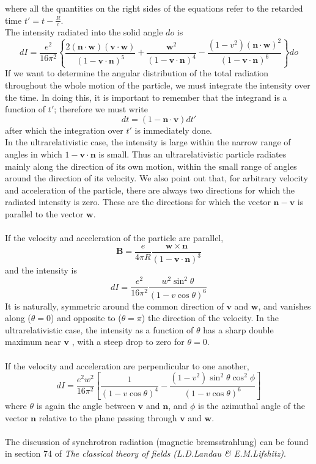 where all the quantities on the right sides of the equations refer to the retarded time $t' = t - \frac{R}{c}$. \\
The intensity radiated into the solid angle $do$ is
\[dI = \frac{e^2}{16\pi^2} \left\{ \frac{2(\bm{n}\cdot\bm{w})(\bm{v}\cdot\bm{w})}{(1-\bm{v}\cdot\bm{n})^5} + \frac{\bm{w}^2}{(1-\bm{v}\cdot\bm{n})^4} - \frac{(1-v^2)(\bm{n}\cdot\bm{w})^2}{(1-\bm{v}\cdot\bm{n})^6}\right\}do\]
If we want to determine the angular distribution of the total radiation throughout the whole motion of the particle, we must integrate the intensity over the time. In doing this, it
is important to remember that the integrand is a function of $t'$; therefore we must write
\[dt = (1-\bm{n}\cdot\bm{v})dt'\]
after which the integration over $t'$ is immediately done.\\
In the ultrarelativistic case, the intensity is large within the narrow range of angles in which $1-\bm{v}\cdot\bm{n}$ is small. Thus an ultrarelativistic particle radiates mainly along the direction of its own motion, within the small range  of angles around the direction of its velocity. We also point out that, for arbitrary velocity and acceleration of the particle, there are always two directions for which the radiated intensity is zero. These are the directions for
which the vector $\bm{n}-\bm{v}$ is parallel to the vector $\bm{w}$.\\ \\
If the velocity and acceleration of the particle are parallel,
\[\bm{B} = \frac{e}{4\pi R} \frac{\bm{w} \times \bm{n}}{(1-\bm{v}\cdot\bm{n})^3}\]
and the intensity is
\[dI = \frac{e^2}{16\pi^2} \frac{w^2 \sin^2 \theta}{(1-v\cos\theta)^6}\]
It is naturally, symmetric around the common direction of $\bm{v}$ and $\bm{w}$, and vanishes along ($\theta=0$) and opposite to ($\theta = \pi$) the direction of the velocity. In the ultrarelativistic case, the intensity as a function of $\theta$ has a sharp double maximum near $\bm{v}$ , with a steep drop to zero for $\theta = 0$.
\\ \\
If the velocity and acceleration are perpendicular to one another,
\[dI = \frac{e^2 w^2}{16\pi^2} \left[ \frac{1}{(1-v\cos\theta)^4} - \frac{(1-v^2)\sin^2\theta \cos^2\phi}{(1-v\cos\theta)^6} \right]\]
where $\theta$ is again the angle between $\bm{v}$ and $\bm{n}$, and $\phi$ is the azimuthal angle of the vector $\bm{n}$ relative to the plane passing through $\bm{v}$ and $\bm{w}$.\\ \\
The discussion of synchrotron radiation (magnetic bremsstrahlung) can be found in section 74 of \emph{The classical theory of fields (L.D.Landau \& E.M.Lifshitz)}.


